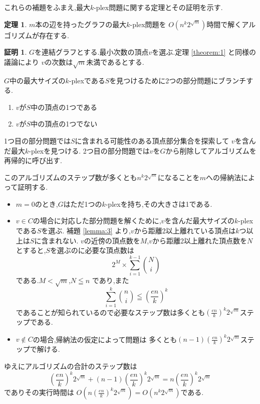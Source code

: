 \documentclass{thesis}
\theoremstyle{definition}
\newtheorem{theorem}{定理}[chapter]
\newtheorem*{prf*}{証明}
\begin{document}
これらの補題をふまえ,最大$k$-plex問題に関する定理とその証明を示す.
\begin{theorem} \label{theorem:3}
$m$本の辺を持ったグラフの最大$k$-plex問題を
$O(n^{k}2^{\sqrt{m}})$時間で解くアルゴリズムが存在する.
\begin{prf*}
$G$を連結グラフとする.最小次数の頂点$v$を選ぶ.定理 \ref{theorem:1} と同様の議論により
$v$の次数は$\sqrt{m}$未満であるとする.

$G$中の最大サイズの$k$-plexである$S$を見つけるために2つの部分問題にブランチする.
\begin{enumerate}
 \item $v$が$S$中の頂点の1つである
 \item $v$が$S$中の頂点の1つでない
\end{enumerate}
1つ目の部分問題では$S$に含まれる可能性のある頂点部分集合を探索して
$v$を含んだ最大$k$-plexを見つける.
2つ目の部分問題では$v$を$G$から削除してアルゴリズムを再帰的に呼び出す.

このアルゴリズムのステップ数が多くとも$n^{k}2^{\sqrt{m}}$になることを$m$への帰納法によって証明する.
\begin{itemize}
 \item $m = 0$のとき,$G$はただ1つの$k$-plexを持ち,その大きさは1である.	
 \item $v \in C$の場合に対応した部分問題を解くために,$v$を含んだ最大サイズの$k$-plexである$S$を選ぶ.
補題  \ref{lemma:3} より,$v$から距離2以上離れている頂点は$k$つ以上は$S$に含まれない.
$v$の近傍の頂点数を$M$,$v$から距離2以上離れた頂点数を$N$とすると,$S$を選ぶのに必要な頂点数は
\[ 2^{M} \times  \sum_{i = 1}^{k - 1}\binom{N}{i}  \]
である.$M < \sqrt{m}$,$N \leqq n$ であり,また
\[ \sum_{i = 1}^{k}\binom{n}{i}  \leqq {\left( \frac{en}{k} \right)}^{k} \]
であることが知られているので必要なステップ数は多くとも${\left( \frac{en}{k} \right)}^{k}2^{\sqrt{m}}$ステップである.
 \item $v \notin C$の場合,帰納法の仮定によって問題は
多くとも$(n - 1){\left( \frac{en}{k} \right)}^{k}2^{\sqrt{m}}$ステップで解ける.
\end{itemize}
ゆえにアルゴリズムの合計のステップ数は
\[  {\left( \frac{en}{k} \right)}^{k}2^{\sqrt{m}} +  (n - 1){\left( \frac{en}{k} \right)}^{k}2^{\sqrt{m}} =n{\left( \frac{en}{k} \right)}^{k}2^{\sqrt{m}} \]
でありその実行時間は $O(n{\left( \frac{en}{k} \right)}^{k}2^{\sqrt{m}}) = O(n^{k}2^{\sqrt{m}})$である.
\end{prf*}
\end{theorem}

\newpage
\end{document}
